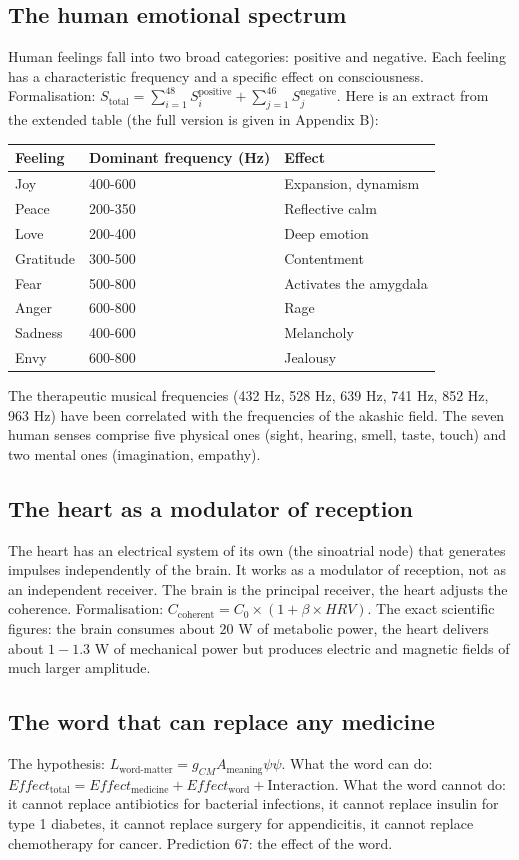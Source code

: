 \subsection{The human emotional spectrum}
Human feelings fall into two broad categories: positive and negative. Each feeling has a characteristic frequency and a specific effect on consciousness. Formalisation: $S_{\text{total}} = \sum_{i=1}^{48} S_i^{\text{positive}} + \sum_{j=1}^{46} S_j^{\text{negative}}$. Here is an extract from the extended table (the full version is given in Appendix B):
\begin{table}[H]
\centering
\begin{tabular}{@{}lll@{}}
\toprule
\textbf{Feeling} & \textbf{Dominant frequency (Hz)} & \textbf{Effect} \\ \midrule
Joy & 400-600 & Expansion, dynamism \\
Peace & 200-350 & Reflective calm \\
Love & 200-400 & Deep emotion \\
Gratitude & 300-500 & Contentment \\
Fear & 500-800 & Activates the amygdala \\
Anger & 600-800 & Rage \\
Sadness & 400-600 & Melancholy \\
Envy & 600-800 & Jealousy \\ \bottomrule
\end{tabular}
\end{table}
The therapeutic musical frequencies (432 Hz, 528 Hz, 639 Hz, 741 Hz, 852 Hz, 963 Hz) have been correlated with the frequencies of the akashic field. The seven human senses comprise five physical ones (sight, hearing, smell, taste, touch) and two mental ones (imagination, empathy).

\subsection{The heart as a modulator of reception}
The heart has an electrical system of its own (the sinoatrial node) that generates impulses independently of the brain. It works as a modulator of reception, not as an independent receiver. The brain is the principal receiver, the heart adjusts the coherence. Formalisation: $C_{\text{coherent}} = C_0 \times (1 + \beta \times HRV)$. The exact scientific figures: the brain consumes about $20$ W of metabolic power, the heart delivers about $1-1.3$ W of mechanical power but produces electric and magnetic fields of much larger amplitude.

\subsection{The word that can replace any medicine}
The hypothesis: $L_{\text{word-matter}} = g_{CM} A_{\text{meaning}} \psi \psi$. What the word can do: $Effect_{\text{total}} = Effect_{\text{medicine}} + Effect_{\text{word}} + \text{Interaction}$. What the word cannot do: it cannot replace antibiotics for bacterial infections, it cannot replace insulin for type 1 diabetes, it cannot replace surgery for appendicitis, it cannot replace chemotherapy for cancer. Prediction 67: the effect of the word.

\newpage
